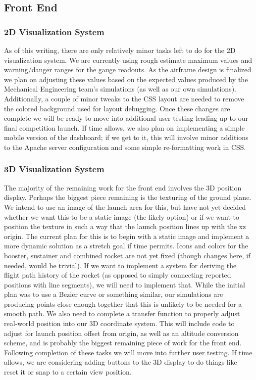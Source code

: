 \documentclass[journal,10pt,onecolumn,compsoc]{IEEEtran}
\begin{document}
	\subsection{Front End}
		\subsubsection{2D Visualization System}
			As of this writing, there are only relatively minor tasks left to do for the 2D visualization system. 
			We are currently using rough estimate maximum values and warning/danger ranges for the gauge readouts. 
			As the airframe design is finalized we plan on adjusting these values based on the expected values produced by the Mechanical Engineering team's simulations (as well as our own simulations).
			Additionally, a couple of minor tweaks to the CSS layout are needed to remove the colored background used for layout debugging.
			Once these changes are complete we will be ready to move into additional user testing leading up to our final competition launch.
			If time allows, we also plan on implementing a simple mobile version of the dashboard; if we get to it, this will involve minor additions to the Apache server configuration and some simple re-formatting work in CSS.
		\subsubsection{3D Visualization System}
			The majority of the remaining work for the front end involves the 3D position display.
			Perhaps the biggest piece remaining is the texturing of the ground plane.
			We intend to use an image of the launch area for this, but have not yet decided whether we want this to be a static image (the likely option) or if we want to position the texture in such a way that the launch position lines up with the xz origin.
			The current plan for this is to begin with a static image and implement a more dynamic solution as a stretch goal if time permits.
			Icons and colors for the booster, sustainer and combined rocket are not yet fixed (though changes here, if needed, would be trivial).
			If we want to implement a system for deriving the flight path history of the rocket (as opposed to simply connecting reported positions with line segments), we will need to implement that.
			While the initial plan was to use a Bezier curve or something similar, our simulations are producing points close enough together that this is unlikely to be needed for a smooth path.
			We also need to complete a transfer function to properly adjust real-world position into our 3D coordinate system.
			This will include code to adjust for launch position offset from origin, as well as an altitude conversion scheme, and is probably the biggest remaining piece of work for the front end.
			Following completion of these tasks we will move into further user testing.
			If time allows, we are considering adding buttons to the 3D display to do things like reset it or snap to a certain view position.
\end{document}
